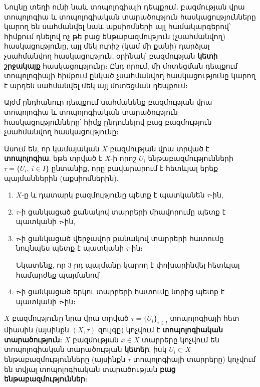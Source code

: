\documentclass[./main.tex]{subfiles}
\begin{document}
\par Նույնը տեղի ունի նաև տոպոլոգիայի դեպքում․ բազմության վրա տոպոլոգիա և տոպոլոգիական տարածություն հասկացությունները կարող են սահմանվել նաև աքսիոմների այլ համակարգերով՝ հիմքում դնելով ոչ թե բաց ենթաբազմություն (չսահմանվող) հասկա\-ցությունը, այլ մեկ ուրիշ (կամ մի քանի) դարձյալ չսահման\-վող հասկացություն, օրինակ՝ բազմության \textbf{կետի շրջակայք} հասկացությունը։ Ընդ որում, մի մոտեցման դեպքում տոպոլոգիայի հիմքում ընկած չսահմանվող հաս\-կա\-ցությունը կարող է արդեն սահմանվել մեկ այլ մոտեցման դեպքում։

\par Այժմ ընդհանուր դեպքում սահմանենք բազմության վրա տոպոլոգիա և տոպո\-լո\-գիա\-կան տարածություն հասկացությունները՝ հիմք ընդունելով բաց բազմություն չսահման\-վող հասկացությունը։

\begin{definition}
Ասում են, որ կամայական $X$ բազմության վրա տրված է \textbf{տո\-պո\-լո\-գիա}, եթե տրված է $X$-ի որոշ $U_i$ ենթաբազմությունների $\tau=\{U_i,\ i\in I\}$ ընտանիք, որը բավարարում է հետևյալ երեք պայմաններին (աքսիոմներին)․
\begin{enumerate}
    \item $X$-ը և դատարկ բազմությունը պետք է պատկանեն $\tau$-ին,
	\item $\tau$-ի ցանկացած քանակով տարրերի միավորումը պետք է պատկանի $\tau$-ին,
	\item $\tau$-ի ցանկացած վերջավոր քանակով տարրերի հատումը նույնպես պետք է պատկանի $\tau$-ին։
	\par Նկատենք, որ 3-րդ պայմանը կարող է փոխարինվել հետևյալ համարժեք պայ\-մա\-նով՝
	\item[3$'$.] $\tau$-ի ցանկացած երկու տարրերի հատումը նորից պետք է պատկանի $\tau$-ին։
\end{enumerate}
\end{definition}


\begin{definition}
$X$ բազմությունը նրա վրա տրված $\tau=\{U_i\}_{i\in I}$ տոպոլոգիայի հետ միասին (այսինքն $(X, \tau)$ զույգը) կոչվում է \textbf{տոպոլոգիական տարածություն}։ $X$ բազմության $x\in X$ տարրերը կոչվում են տոպոլոգիական տարածության \textbf{կետեր}, իսկ $U_i \subset X$ ենթաբազմությունները (այսինքն $\tau$ տոպոլոգիայի տարրերը) կոչվում են տվյալ տոպոլոգիական տարածության \textbf{բաց ենթաբազմություններ}։
\end{definition}
\end{document}
